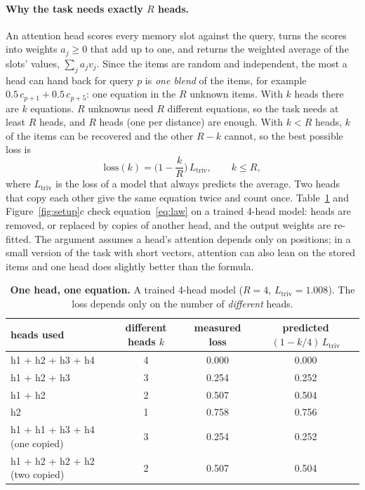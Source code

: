 \documentclass[11pt]{article}
\begin{document}
\paragraph{Why the task needs exactly $R$ heads.} An attention head scores every memory slot
against the query, turns the scores into weights $a_j \ge 0$ that add up to one, and returns the
weighted average of the slots' values, $\sum_j a_j v_j$. Since the items are random and
independent, the most a head can hand back for query $p$ is \emph{one blend} of the items, for
example $0.5\,c_{p+1} + 0.5\,c_{p+5}$: one equation in the $R$ unknown items. With $k$ heads
there are $k$ equations. $R$ unknowns need $R$ different equations, so the task needs at least
$R$ heads, and $R$ heads (one per distance) are enough. With $k < R$ heads, $k$ of the items can be
recovered and the other $R - k$ cannot, so the best possible loss is
\begin{equation}
\text{loss}(k) = \Big(1 - \frac{k}{R}\Big)\, L_{\text{triv}}, \qquad k \le R,
\label{eq:law}
\end{equation}
where $L_{\text{triv}}$ is the loss of a model that always predicts the average. Two heads that
copy each other give the same equation twice and count once. Table~\ref{tab:law} and
Figure~\ref{fig:setup}c check equation~\eqref{eq:law} on a trained 4-head model: heads are removed,
or replaced by copies of another head, and the output weights are re-fitted. The argument assumes
a head's attention depends only on positions; in a small version of the task with short vectors,
attention can also lean on the stored items and one head does slightly better than the formula.

\begin{table}[h]
\centering
\begin{tabular}{lccc}
\toprule
heads used & different heads $k$ & measured loss & predicted $(1 - k/4)\,L_{\text{triv}}$ \\
\midrule
h1 + h2 + h3 + h4 & 4 & 0.000 & 0.000 \\
h1 + h2 + h3      & 3 & 0.254 & 0.252 \\
h1 + h2           & 2 & 0.507 & 0.504 \\
h2                & 1 & 0.758 & 0.756 \\
h1 + h1 + h3 + h4 (one copied) & 3 & 0.254 & 0.252 \\
h1 + h2 + h2 + h2 (two copied) & 2 & 0.507 & 0.504 \\
\bottomrule
\end{tabular}
\caption{\textbf{One head, one equation.} A trained 4-head model ($R = 4$, $L_{\text{triv}} = 1.008$).
The loss depends only on the number of \emph{different} heads.}
\label{tab:law}
\end{table}
\end{document}
